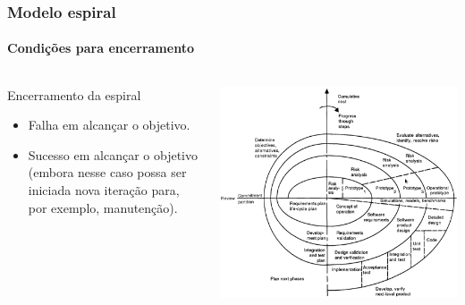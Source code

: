 \begin{frame}
	\frametitle{Modelo espiral}
	\framesubtitle{Condições para encerramento}

	\begin{columns}
		\begin{block:fact}{Encerramento da espiral}
			\begin{itemize}
				\item Falha em alcançar o objetivo.
				\item Sucesso em alcançar o objetivo (embora nesse caso possa ser iniciada
				nova iteração para, por exemplo, manutenção).
			\end{itemize}
		\end{block:fact}

		\begin{block:fact}{}
			\centering
			\includegraphics[width=\textwidth]{software-engineering/project-management/process/sdlc/spiral/spiral}
		\end{block:fact}
	\end{columns}
\end{frame}



